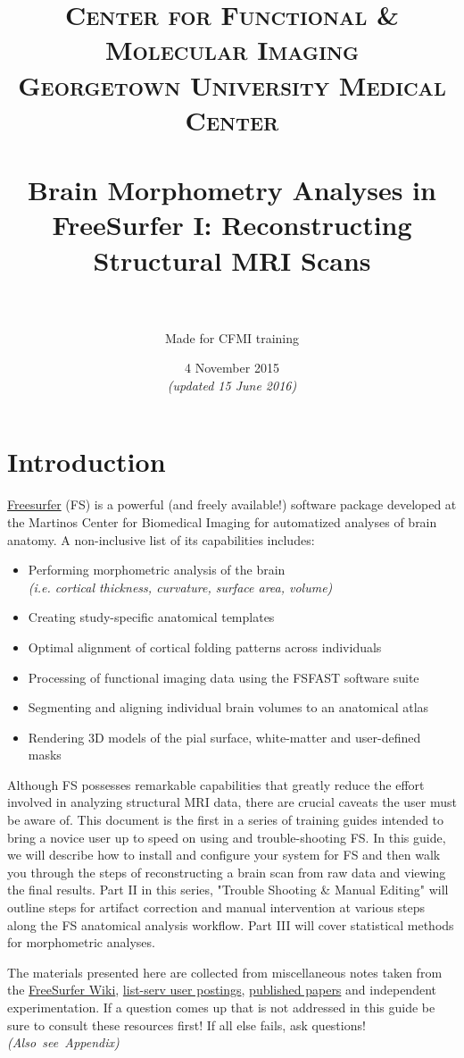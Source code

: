 \documentclass[paper=a4, fontsize=11pt]{scrartcl} %
\title{	
\normalfont \normalsize 
\textsc{Center for Functional \& Molecular Imaging \\ Georgetown University Medical Center} \\ [25pt] %
\horrule{0.5pt} \\[0.4cm] %
\huge Brain Morphometry Analyses in FreeSurfer I:  Reconstructing Structural MRI Scans  \\ %
\horrule{2pt} \\[0.5cm] %
}
\author{Made for CFMI training} %
\date{\normalsize 4 November 2015\\\textit{(updated 15 June 2016)}} %
\numberwithin{equation}{section} %
\numberwithin{figure}{section} %
\numberwithin{table}{section} %
\begin{document}
\maketitle %

\lstset{escapechar=\@} %
\section{Introduction}  \href{https://surfer.nmr.mgh.harvard.edu/}{Freesurfer} (FS) is a powerful (and freely available!) software package developed at the Martinos Center for Biomedical Imaging for automatized analyses of brain anatomy.  A non-inclusive list of its capabilities includes:
\begin{itemize}
	\item Performing morphometric analysis of the brain \\  \textit{(i.e. cortical thickness, curvature, surface area, volume)}
	\item Creating study-specific anatomical templates
	\item Optimal alignment of cortical folding patterns across individuals
	\item Processing of functional imaging data using the FSFAST software suite
	\item Segmenting and aligning individual brain volumes to an anatomical atlas
	\item Rendering 3D models of the pial surface, white-matter and user-defined masks
\end{itemize}

Although FS possesses remarkable capabilities that greatly reduce the effort involved in analyzing structural MRI data, there are crucial caveats the user must be aware of. This document is the first in a series of training guides intended to bring a novice user up to speed on using and trouble-shooting FS.  In this guide, we will describe how to install and configure your system for FS and then walk you through the steps of reconstructing a brain scan from raw data and viewing the final results.  Part II in this series, "Trouble Shooting \& Manual Editing" will outline steps for artifact correction and manual intervention at various steps along the FS anatomical analysis workflow. Part III will cover statistical methods for morphometric analyses.

The materials presented here are collected from miscellaneous notes taken from the \href{https://surfer.nmr.mgh.harvard.edu/fswiki}{FreeSurfer Wiki}, \href{http://www.mail-archive.com/freesurfer@nmr.mgh.harvard.edu/}{list-serv user postings}, \href{https://www.zotero.org/freesurfer}{published papers} and independent experimentation.  If a question comes up that is not addressed in this guide be sure to consult these resources first! If all else fails, ask questions! \mbox{\textit{(Also see Appendix)}}
\end{document}
